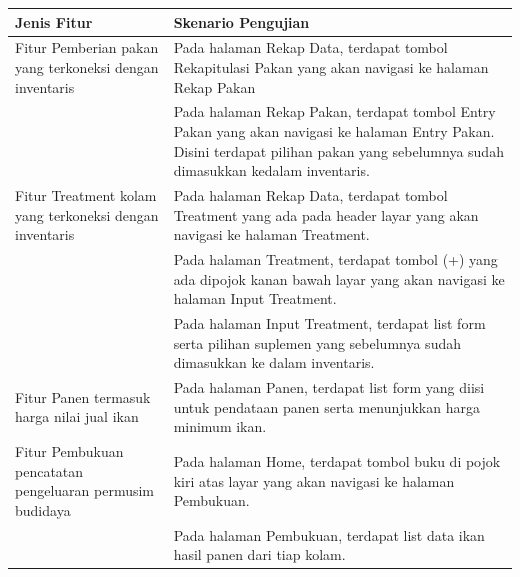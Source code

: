 \begin{spacing}{1.5}
\begin{enumerate}
	\begin{table}[H]	
		\begin{center}
			\begin{tabular}{|m{13em}|m{17em}|}
			\hline
			\textbf{Jenis Fitur} & \textbf{Skenario Pengujian} \\
			\hline	
			Fitur Pemberian pakan yang terkoneksi dengan inventaris & Pada halaman Rekap Data, terdapat tombol Rekapitulasi Pakan yang akan navigasi ke halaman Rekap Pakan \\
			\hline
			& Pada halaman Rekap Pakan, terdapat tombol Entry Pakan yang akan navigasi ke halaman Entry Pakan. Disini terdapat pilihan pakan yang sebelumnya sudah dimasukkan kedalam inventaris. \\
			\hline
			Fitur Treatment kolam yang terkoneksi dengan inventaris & Pada halaman Rekap Data, terdapat tombol Treatment yang ada pada header layar yang akan navigasi ke halaman Treatment. \\
			\hline
			& Pada halaman Treatment, terdapat tombol (+) yang ada dipojok kanan bawah layar yang akan navigasi ke halaman Input Treatment. \\
			\hline
			& Pada halaman Input Treatment, terdapat list form serta pilihan suplemen yang sebelumnya sudah dimasukkan ke dalam inventaris. \\
			\hline
			Fitur Panen termasuk harga nilai jual ikan & Pada halaman Panen, terdapat list form yang diisi untuk pendataan panen serta menunjukkan harga minimum ikan. \\
			\hline
			Fitur Pembukuan pencatatan pengeluaran permusim budidaya & Pada halaman Home, terdapat tombol buku di pojok kiri atas layar yang akan navigasi ke halaman Pembukuan. \\
			\hline
			& Pada halaman Pembukuan, terdapat list data ikan hasil panen dari tiap kolam. \\
			\hline
			\end{tabular}
		\end{center}
	\end{table}
	
	

		

\end{enumerate}
\end{spacing}
